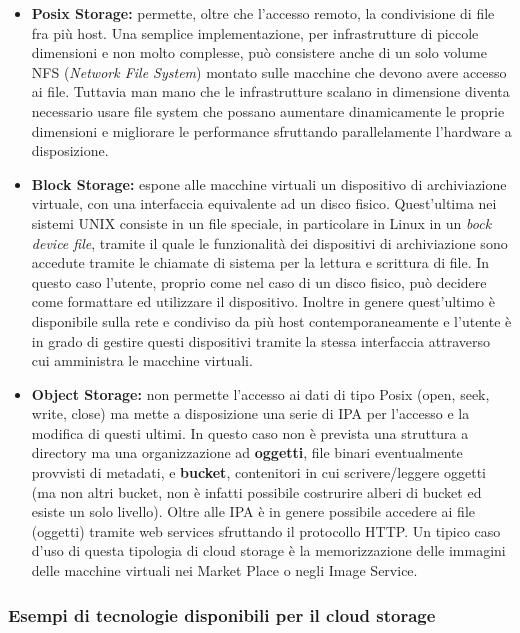 \documentclass[italian,]{article}
\providecommand{\tightlist}{%
  \setlength{\itemsep}{0pt}\setlength{\parskip}{0pt}}
\begin{document}
\begin{itemize}
\tightlist
\item
  \textbf{Posix Storage:} permette, oltre che l'accesso remoto, la
  condivisione di file fra più host. Una semplice implementazione, per
  infrastrutture di piccole dimensioni e non molto complesse, può
  consistere anche di un solo volume NFS (\emph{Network File System})
  montato sulle macchine che devono avere accesso ai file. Tuttavia man
  mano che le infrastrutture scalano in dimensione diventa necessario
  usare file system che possano aumentare dinamicamente le proprie
  dimensioni e migliorare le performance sfruttando parallelamente
  l'hardware a disposizione.
\item
  \textbf{Block Storage:} espone alle macchine virtuali un dispositivo
  di archiviazione virtuale, con una interfaccia equivalente ad un disco
  fisico. Quest'ultima nei sistemi UNIX consiste in un file speciale, in
  particolare in Linux in un \emph{bock device file}, tramite il quale
  le funzionalità dei dispositivi di archiviazione sono accedute tramite
  le chiamate di sistema per la lettura e scrittura di file. In questo
  caso l'utente, proprio come nel caso di un disco fisico, può decidere
  come formattare ed utilizzare il dispositivo. Inoltre in genere
  quest'ultimo è disponibile sulla rete e condiviso da più host
  contemporaneamente e l'utente è in grado di gestire questi dispositivi
  tramite la stessa interfaccia attraverso cui amministra le macchine
  virtuali.
\item
  \textbf{Object Storage:} non permette l'accesso ai dati di tipo Posix
  (open, seek, write, close) ma mette a disposizione una serie di IPA
  per l'accesso e la modifica di questi ultimi. In questo caso non è
  prevista una struttura a directory ma una organizzazione ad
  \textbf{oggetti}, file binari eventualmente provvisti di metadati, e
  \textbf{bucket}, contenitori in cui scrivere/leggere oggetti (ma non
  altri bucket, non è infatti possibile costrurire alberi di bucket ed
  esiste un solo livello). Oltre alle IPA è in genere possibile accedere
  ai file (oggetti) tramite web services sfruttando il protocollo HTTP.
  Un tipico caso d'uso di questa tipologia di cloud storage è la
  memorizzazione delle immagini delle macchine virtuali nei Market Place
  o negli Image Service.
\end{itemize}

\subsubsection{Esempi di tecnologie disponibili per il cloud
storage}\label{esempi-di-tecnologie-disponibili-per-il-cloud-storage}
\end{document}
